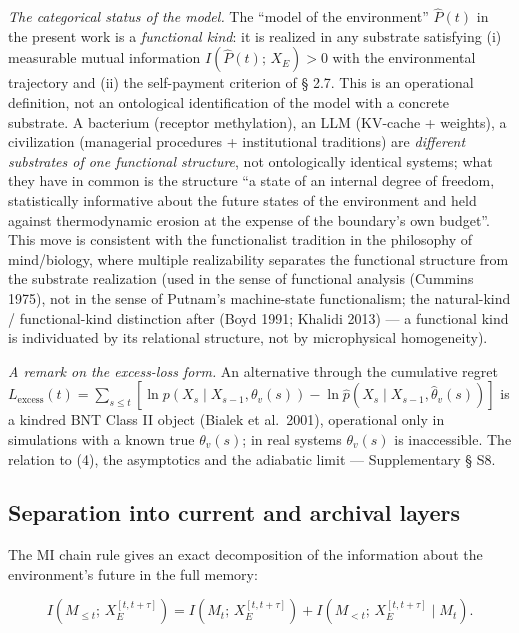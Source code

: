 \documentclass[pdflatex,sn-mathphys-ay]{sn-jnl}
\providecommand{\lt}{<}\providecommand{\gt}{>}
\begin{document}
\emph{The categorical status of the model.} The ``model of the environment'' \(\hat P(t)\) in the present work is a \emph{functional kind}: it is realized in any substrate satisfying (i) measurable mutual information \(I(\hat P(t);\, X_E) > 0\) with the environmental trajectory and (ii) the self-payment criterion of § 2.7. This is an operational definition, not an ontological identification of the model with a concrete substrate. A bacterium (receptor methylation), an LLM (KV-cache + weights), a civilization (managerial procedures + institutional traditions) are \emph{different substrates of one functional structure}, not ontologically identical systems; what they have in common is the structure ``a state of an internal degree of freedom, statistically informative about the future states of the environment and held against thermodynamic erosion at the expense of the boundary's own budget''. This move is consistent with the functionalist tradition in the philosophy of mind/biology, where multiple realizability separates the functional structure from the substrate realization (used in the sense of functional analysis (Cummins 1975), not in the sense of Putnam's machine-state functionalism; the natural-kind / functional-kind distinction after (Boyd 1991; Khalidi 2013) --- a functional kind is individuated by its relational structure, not by microphysical homogeneity).



\emph{A remark on the excess-loss form.} An alternative through the cumulative regret \(L_{\text{excess}}(t) = \sum_{s\le t} [\ln p(X_s\mid X_{s-1},\theta_v(s)) - \ln \hat p(X_s\mid X_{s-1},\hat\theta_v(s))]\) is a kindred BNT Class II object (Bialek et al.~2001), operational only in simulations with a known true \(\theta_v(s)\); in real systems \(\theta_v(s)\) is inaccessible. The relation to (4), the asymptotics and the adiabatic limit --- Supplementary § S8.



\subsection{Separation into current and archival layers}\label{separation-into-current-and-archival-layers}



The MI chain rule gives an exact decomposition of the information about the environment's future in the full memory:



\begin{equation}I\!\left(M_{\le t};\, X_E^{[t, t+\tau]}\right) = I\!\left(M_t;\, X_E^{[t, t+\tau]}\right) + I\!\left(M_{\lt t};\, X_E^{[t, t+\tau]} \mid M_t\right). \tag{5}\end{equation}
\end{document}
